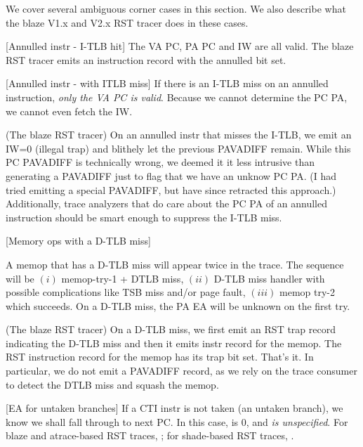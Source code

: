 \documentclass[10pt]{article}
\begin{document}
We cover several ambiguous corner cases in this section. We also
describe what the blaze V1.x and V2.x RST tracer does in these cases.

\begin{rqitemize}{0em}
  \item {}[Annulled instr - I-TLB hit]
  The VA PC, PA PC and IW are all valid.  The blaze RST tracer emits an
  instruction record with the annulled bit set.

  \item {}[Annulled instr - with ITLB miss] If there is an I-TLB miss on
  an annulled instruction, \textsl{only the VA PC is valid}.  Because we
  cannot determine the PC PA, we cannot even fetch the IW.

(The blaze RST tracer) On an annulled instr that misses the I-TLB, we
emit an IW=0 (illegal trap) and blithely let the previous PAVADIFF
remain.  While this PC PAVADIFF is technically wrong, we deemed it it
less intrusive than generating a PAVADIFF just to flag that we have an
unknow PC PA.  (I had tried emitting a special PAVADIFF, but have since
retracted this approach.)  Additionally, trace analyzers that do care
about the PC PA of an annulled instruction should be smart enough to
suppress the I-TLB miss.

  \item {}[Memory ops with a D-TLB miss]

  A memop that has a D-TLB miss will appear twice in the trace.  The
  sequence will be $(i)$ memop-try-1 + DTLB miss, $(ii)$ D-TLB miss handler
  with possible complications like TSB miss and/or page fault, $(iii)$
  memop try-2 which succeeds.  On a D-TLB miss, the
  PA EA will be unknown on the first try.

(The blaze RST tracer) On a D-TLB miss, we first emit an RST trap
record indicating the D-TLB miss and then it emits instr record for the
memop.  The RST instruction record for the memop has its trap bit set.
That's it.  In particular, we do not emit a PAVADIFF record, as we rely
on the trace consumer to detect the DTLB miss and squash the memop.

  \item {}[EA for untaken branches] 
If a CTI instr is not taken (an untaken branch), we know we shall fall
through to next PC.  In this case,  is 0,
and  \textsl{is unspecified}.  For blaze and
atrace-based RST traces, ; for
shade-based RST traces, .


\end{rqitemize}
\end{document}
